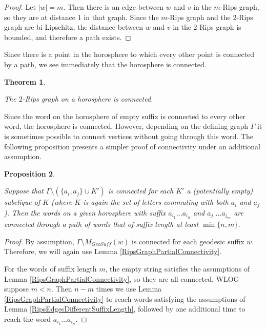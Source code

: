 \documentclass{amsart}
\newtheorem{theorem}{Theorem}[subsection]
\newtheorem{proposition}[theorem]{Proposition}
\theoremstyle{definition}
\theoremstyle{remark}
\begin{document}
	\begin{proof}
		
		Let $|w|=m$. Then there is an edge between $w$ and $v$ in the $m$-Rips graph, so they are at distance $1$ in that graph. Since the $m$-Rips graph and the $2$-Rips graph are bi-Lipschitz, the distance between $w$ and $v$ in the $2$-Rips graph is bounded, and therefore a path exists.
	\end{proof}
	
	Since there is a point in the horosphere to which every other point is connected by a path, we see immediately that the horosphere is connected.
	
	\begin{theorem} \label{RipsGraphConnectivity}
		
		The $2$-Rips graph on a horosphere is connected.
		
	\end{theorem}
	
	Since the word on the horosphere of empty suffix is connected to every other word, the horosphere is connected. However, depending on the defining graph $\Gamma$ it is sometimes possible to connect vertices without going through this word. The following proposition presents a simpler proof of connectivity under an additional assumption.
	
	\begin{proposition}\label{RipsGraphNoCutPtConnectivity}
		
		Suppose that $\Gamma\setminus (\{a_i, a_j\}\cup K')$ is connected for each $K'$ a (potentially empty) subclique of $K$ (where $K$ is again the set of letters commuting with both $a_i$ and $a_j$). Then the words on a given horosphere with suffix $a_{i_1}...a_{i_n}$ and $a_{j_1}...a_{j_m}$ are connected through a path of words that of suffix length at least $\min\{n, m\}$.
		
	\end{proposition}
	
	\begin{proof}
		
		By assumption, $\Gamma\setminus M_{GeoSuff}(w)$ is connected for each geodesic suffix $w$. Therefore, we will again use Lemma \ref{RipsGraphPartialConnectivity}.
		
		For the words of suffix length $m$, the empty string satisfies the assumptions of Lemma \ref{RipsGraphPartialConnectivity}, so they are all connected. WLOG suppose $m<n$. Then $n-m$ times we use Lemma \ref{RipsGraphPartialConnectivity} to reach words satisfying the assumptions of Lemma \ref{RipsEdgesDifferentSuffixLength}, followed by one additional time to reach the word $a_{i_1}...a_{i_n}$.
	\end{proof}
	
\end{document}
